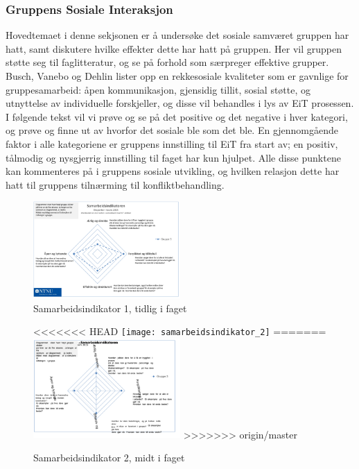 \subsubsection{Gruppens Sosiale Interaksjon}

Hovedtemaet i denne sekjsonen er å undersøke det sosiale samværet gruppen har hatt, samt diskutere hvilke effekter dette har hatt på gruppen. Her vil gruppen støtte seg til faglitteratur\cite{orgorg}, og se på forhold som særpreger effektive grupper. Busch, Vanebo og Dehlin\cite[p.~257]{orgorg} lister opp en rekkesosiale kvaliteter som er gavnlige for gruppesamarbeid: åpen kommunikasjon, gjensidig tillit, sosial støtte, og utnyttelse av individuelle forskjeller, og disse vil behandles i lys av EiT prosessen. I følgende tekst vil vi prøve og se på det positive og det negative i hver kategori, og prøve og finne ut av hvorfor det sosiale ble som det ble. En gjennomgående faktor i alle kategoriene er gruppens innstilling til EiT fra start av; en positiv, tålmodig og nysgjerrig innstilling til faget har kun hjulpet. Alle disse punktene kan kommenteres på i gruppens sosiale utvikling, og hvilken relasjon dette har hatt til gruppens tilnærming til konfliktbehandling. 

\begin{figure}[h!]
  \caption{Samarbeidsindikator 1, tidlig i faget}
  \centering
    \includegraphics[width=0.5\textwidth]{Bilder/samarbeidsindikator1.png}
\end{figure}\label{samarbeidsindikator1}

\begin{figure}[h!]
  \caption{Samarbeidsindikator 2, midt i faget}
  \centering
<<<<<<< HEAD
    \texttt{[image: samarbeidsindikator\_2]}
=======
    \includegraphics[width=0.5\textwidth]{Bilder/samarbeidsindikator_2.png}
>>>>>>> origin/master
\end{figure}\label{samarbeidsindikator2}

